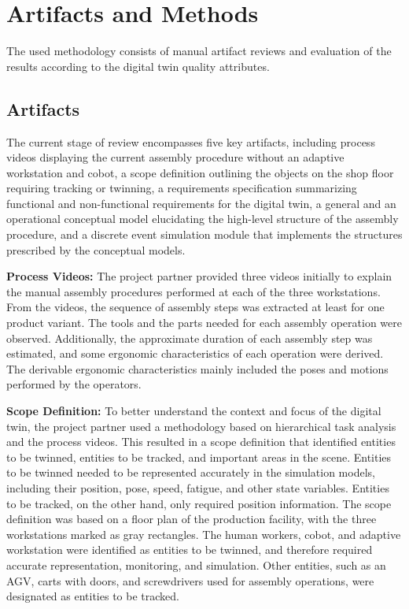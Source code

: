 \documentclass{llncs}
\begin{document}
    \section{Artifacts and Methods}
    The used methodology consists of manual artifact reviews and evaluation of the results according to the digital twin quality attributes.    
    \subsection{Artifacts}
    The current stage of review encompasses five key artifacts, including process videos displaying the current assembly procedure without an adaptive workstation and cobot, a scope definition outlining the objects on the shop floor requiring tracking or twinning, a requirements specification summarizing functional and non-functional requirements for the digital twin, a general and an operational conceptual model elucidating the high-level structure of the assembly procedure, 
    and a discrete event simulation module that implements the structures prescribed by the conceptual models.

    \textbf{Process Videos:}
    The project partner provided three videos initially to explain the manual assembly procedures performed at each of the three workstations. From the videos,  
    the sequence of assembly steps was extracted at least for one product variant. The tools and the parts needed for each assembly operation were observed. Additionally, the approximate duration of each assembly step 
    was estimated, and some ergonomic characteristics of each operation were derived. 
    The derivable ergonomic characteristics mainly included the poses and motions performed by the operators.

    \textbf{Scope Definition:}
    To better understand the context and focus of the digital twin, 
    the project partner used a methodology based on hierarchical task analysis and the process videos. 
    This resulted in a scope definition that identified entities to be twinned, entities to be tracked, and important areas in the scene. 
    Entities to be twinned needed to be represented accurately in the simulation models, including their position, pose, speed, fatigue, and other state variables. 
    Entities to be tracked, on the other hand, only required position information. The scope definition was based on a floor plan of the production facility, with the three workstations marked as gray rectangles. 
    The human workers, cobot, and adaptive workstation were identified as entities to be twinned, and therefore required accurate representation, 
    monitoring, and simulation. Other entities, such as an AGV, carts with doors, and screwdrivers used for assembly operations, were designated as entities to be tracked.
\end{document}
